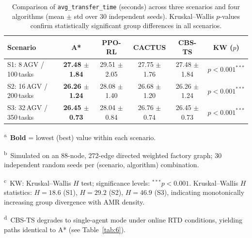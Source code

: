 \begin{table}[htbp]
  \centering
  \caption{Comparison of \texttt{avg\_transfer\_time} (seconds) across three scenarios
           and four algorithms (mean $\pm$ std over 30 independent seeds).
           Kruskal--Wallis $p$-values confirm statistically significant group differences
           in all scenarios.}
  \label{tab:5}
  \small
  \begin{threeparttable}
    \begin{tabular}{lccccc}
      \toprule
      \textbf{Scenario}
        & \textbf{A*}
        & \textbf{PPO-RL}
        & \textbf{CACTUS}
        & \textbf{CBS-TS}
        & \textbf{KW ($p$)} \\
      \midrule
      S1: 8\,AGV / 100\,tasks
        & \textbf{27.48 $\pm$ 1.84}
        & 29.51 $\pm$ 2.05
        & 27.75 $\pm$ 1.76
        & 27.48 $\pm$ 1.84
        & $p{<}0.001^{***}$ \\
      S2: 16\,AGV / 200\,tasks
        & \textbf{26.26 $\pm$ 1.24}
        & 28.08 $\pm$ 1.40
        & 26.68 $\pm$ 1.20
        & 26.26 $\pm$ 1.24
        & $p{<}0.001^{***}$ \\
      S3: 32\,AGV / 350\,tasks
        & \textbf{26.45 $\pm$ 0.73}
        & 28.04 $\pm$ 0.84
        & 26.76 $\pm$ 0.74
        & 26.45 $\pm$ 0.73
        & $p{<}0.001^{***}$ \\
      \bottomrule
    \end{tabular}
    \begin{tablenotes}
      \footnotesize
      \item \textsuperscript{a}~\textbf{Bold} = lowest (best) value within each scenario.
      \item \textsuperscript{b}~Simulated on an 88-node, 272-edge directed weighted factory
            graph; 30 independent random seeds per (scenario, algorithm) combination.
      \item \textsuperscript{c}~KW: Kruskal--Wallis $H$ test; significance levels:
            $^{***}p{<}0.001$.
            Kruskal--Wallis $H$ statistics: $H{=}18.6$ (S1), $H{=}29.2$ (S2),
            $H{=}46.9$ (S3), indicating monotonically increasing group divergence
            with AMR density.
      \item \textsuperscript{d}~CBS-TS degrades to single-agent mode under online RTD
            conditions, yielding paths identical to A* (see Table~\ref{tab:6}).
    \end{tablenotes}
  \end{threeparttable}
\end{table}


